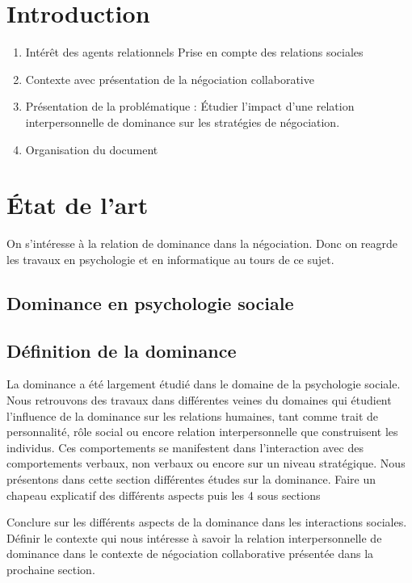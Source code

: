 \documentclass [french]{article}
\begin{document}
	
	\section{Introduction}
		\begin{enumerate}
			\item Intérêt des agents relationnels 
			\subitem Prise en compte des relations sociales
			\item Contexte avec présentation de la négociation collaborative
			\item Présentation de la problématique : Étudier l'impact d'une relation interpersonnelle de dominance sur les stratégies de négociation.
				\subitem 
			\item Organisation du document
		\end{enumerate}
		
		
	\section{État de l'art}
		On s'intéresse à la relation de dominance dans la négociation. Donc on reagrde les travaux en psychologie et en informatique au tours de ce sujet.
		
		
		\subsection{Dominance en psychologie sociale}
		
			\subsection{Définition de la dominance}
			La dominance a été largement étudié dans le domaine de la psychologie sociale. Nous retrouvons des travaux dans différentes veines du domaines qui étudient l'influence de la dominance sur les relations humaines, tant comme trait de personnalité, rôle social ou encore relation interpersonnelle que construisent les individus. Ces comportements se manifestent dans l'interaction avec des comportements verbaux, non verbaux ou encore sur un niveau stratégique.		
			Nous présentons dans cette section différentes études sur la dominance.
			Faire un chapeau explicatif des différents aspects puis les 4 sous sections
		
		
				Conclure sur les différents aspects de la dominance dans les interactions sociales.
				Définir le contexte qui nous intéresse à savoir la relation interpersonnelle de dominance dans le contexte de négociation collaborative présentée dans la prochaine section. 
\end{document}
